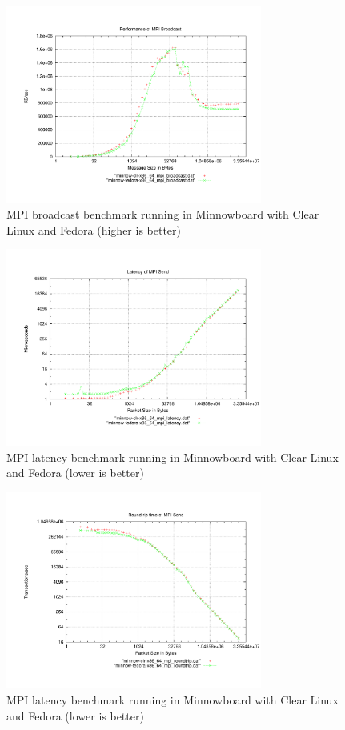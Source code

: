 \begin{figure}[H]
\centering
\includegraphics[width=0.75\textwidth]{images/mpbench_clr_experiments/mpi_broadcast.pdf}
\caption{MPI broadcast benchmark running in Minnowboard with Clear Linux and
Fedora (higher is better)}
\label{fig:5.4}
\end{figure}

\begin{figure}[H]
\centering
\includegraphics[width=0.75\textwidth]{images/mpbench_clr_experiments/mpi_latency.pdf}
\caption{MPI latency benchmark running in Minnowboard with Clear Linux and
Fedora (lower is better)}
\label{fig:5.5}
\end{figure}

\begin{figure}[H]
\centering
\includegraphics[width=0.75\textwidth]{images/mpbench_clr_experiments/mpi_roundtrip.pdf}
\caption{MPI latency benchmark running in Minnowboard with Clear Linux and
Fedora (lower is better)}
\label{fig:5.6}
\end{figure}

